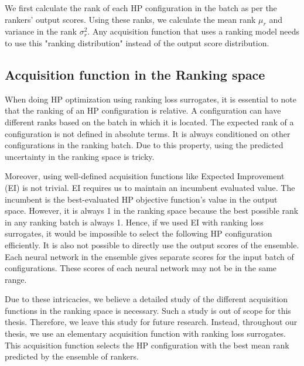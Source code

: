 \documentclass[12pt, twoside, ngerman]{report}
\begin{document}
We first calculate the rank of each HP configuration in the batch as per the rankers' output scores.
Using these ranks, we calculate the mean rank $\mu_r$ and variance in the rank $\sigma^2_r$.
Any acquisition function that uses a ranking model needs to use this "ranking distribution" instead of the output score distribution.

\subsection{Acquisition function in the Ranking space}
\label{sec:AcquisitionFunctionInRankingSpace}
When doing HP optimization using ranking loss surrogates, it is essential to note that the ranking of an HP configuration is relative.
A configuration can have different ranks based on the batch in which it is located.
The expected rank of a configuration is not defined in absolute terms. It is always conditioned on other configurations in the ranking batch.
Due to this property, using the predicted uncertainty in the ranking space is tricky.

Moreover, using well-defined acquisition functions like Expected Improvement (EI) is not trivial. EI requires us to maintain an incumbent evaluated value. The incumbent is the best-evaluated HP objective function's value in the output space. However, it is always 1 in the ranking space because the best possible rank in any ranking batch is always 1. Hence, if we used EI with ranking loss surrogates, it would be impossible to select the following HP configuration efficiently.
It is also not possible to directly use the output scores of the ensemble. Each neural network in the ensemble gives separate scores for the input batch of configurations. These scores of each neural network may not be in the same range.

Due to these intricacies, we believe a detailed study of the different acquisition functions in the ranking space is necessary. Such a study is out of scope for this thesis. Therefore, we leave this study for future research.
Instead, throughout our thesis, we use an elementary acquisition function with ranking loss surrogates. This acquisition function selects the HP configuration with the best mean rank predicted by the ensemble of rankers.
\end{document}
